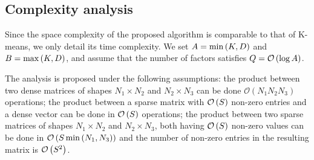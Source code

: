 \subsection{Complexity analysis}

Since the space complexity of the proposed \qkmeans algorithm is comparable to that of K-means, we only detail its time complexity. We set $A=\min\left (K, D\right )$ and $B=\max\left (K, D\right )$, and assume that the number of factors satisfies $Q=\mathcal{O}\left (\log A\right )$.

The analysis is proposed under the following assumptions: the product between two dense matrices of shapes ${N_1\times N_2}$ and ${N_2\times N_3}$ can be done $\mathcal{O}\left (N_1 N_2 N_3 \right )$ operations; 
the product between a sparse matrix with $\mathcal{O}\left (S\right )$ non-zero entries and a dense vector can be done in $\mathcal{O}\left (S\right )$ operations; 
the product between two sparse matrices of shapes ${N_1\times N_2}$ and ${N_2\times N_3}$, both having $\mathcal{O}\left (S\right )$ non-zero values can be done in $\mathcal{O}\left (S \min\left (N_1, N_3\right )\right )$ and the number of non-zero entries in the resulting matrix is $\mathcal{O}\left (S^2\right )$.





%

